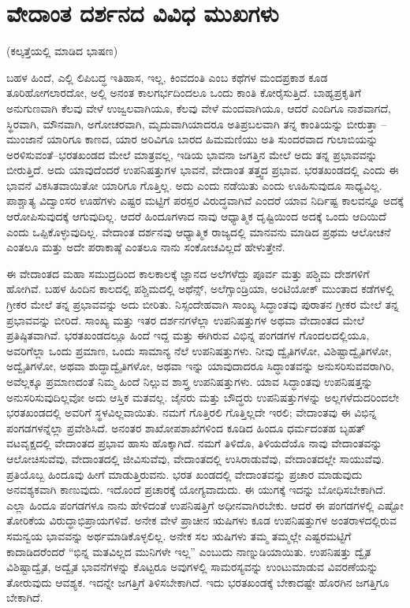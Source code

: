 
\chapter{ವೇದಾಂತ ದರ್ಶನದ ವಿವಿಧ ಮುಖಗಳು}

\begin{center}
(ಕಲ್ಕತ್ತೆಯಲ್ಲಿ ಮಾಡಿದ ಭಾಷಣ)
\end{center}

ಬಹಳ ಹಿಂದೆ, ಎಲ್ಲಿ ಲಿಪಿಬದ್ಧ ಇತಿಹಾಸ, ಇಲ್ಲ, ಕಿಂವದಂತಿ ಎಂಬ ಕಥೆಗಳ ಮಂದಪ್ರಕಾಶ ಕೂಡ ತೂರಿಹೋಗಲಾರದೋ, ಅಲ್ಲಿ ಅನಂತ ಕಾಲಗರ್ಭದಿಂದಲೂ ಒಂದು ಕಾಂತಿ ಕೋರೈಸುತ್ತಿದೆ. ಬಾಹ್ಯಪ್ರಕೃತಿಗೆ ಅನುಗುಣವಾಗಿ ಕೆಲವು ವೇಳೆ ಉಜ್ವಲವಾಗಿಯೂ, ಕೆಲವು ವೇಳೆ ಮಂದವಾಗಿಯೂ, ಆದರೆ ಎಂದಿಗೂ ನಾಶವಾಗದೆ, ಸ್ಥಿರವಾಗಿ, ಮೌನವಾಗಿ, ಅಗೋಚರವಾಗಿ, ಮೃದುವಾಗಿಯಾದರೂ ಅತಿಪ್ರಬಲವಾಗಿ ತನ್ನ ಕಾಂತಿಯನ್ನು ಬೀರುತ್ತಾ – ಮುಂಜಾನೆ ಯಾರಿಗೂ ಕಾಣದ, ಯಾರ ಅರಿವಿಗೂ ಬಾರದ ಹಿಮಮಣಿಯು ಅತಿ ಸುಂದರವಾದ ಗುಲಾಬಿಯನ್ನು ಅರಳಿಸುವಂತೆ–ಭರತಖಂಡದ ಮೇಲೆ ಮಾತ್ರವಲ್ಲ, ಇಡಿಯ ಭಾವನಾ ಜಗತ್ತಿನ ಮೇಲೆ ಅದು ತನ್ನ ಪ್ರಭಾವವನ್ನು ಬೀರುತ್ತಿದೆ. ಅದು ಯಾವುದೆಂದರೆ ಉಪನಿಷತ್ತುಗಳ ಭಾವನೆ, ವೇದಾಂತ ತತ್ತ್ವದ ಪ್ರಭಾವ. ಭರತಖಂಡದಲ್ಲಿ ಎಂದು ಈ ಭಾವನೆ ವಿಕಸಿತವಾಯಿತೋ ಯಾರಿಗೂ ಗೊತ್ತಿಲ್ಲ. ಅದು ಎಂದು ನಡೆಯಿತು ಎಂದು ಊಹಿಸುವುದೂ ಸಾಧ್ಯವಿಲ್ಲ. ಪಾಶ್ಚಾತ್ಯ ವಿದ್ವಾಂಸರ ಊಹೆಗಳು ಎಷ್ಟರ ಮಟ್ಟಿಗೆ ಪರಸ್ಪರ ವಿರುದ್ಧವಾಗಿವೆ ಎಂದರೆ ಯಾವ ನಿರ್ದಿಷ್ಟ ಕಾಲವನ್ನೂ ಅದಕ್ಕೆ ಆರೋಪಿಸುವುದಕ್ಕೆ ಆಗುವುದಿಲ್ಲ. ಆದರೆ ಹಿಂದೂಗಳಾದ ನಾವು ಆಧ್ಯಾತ್ಮಿಕ ದೃಷ್ಟಿಯಿಂದ ಅದಕ್ಕೆ ಒಂದು ಆದಿಯಿದೆ ಎಂದು ಒಪ್ಪಿಕೊಳ್ಳುವುದಿಲ್ಲ. ವೇದಾಂತ ದರ್ಶನವು ಆಧ್ಯಾತ್ಮಿಕ ರಾಜ್ಯದಲ್ಲಿ ಮಾನವನು ಮಾಡಿದ ಪ್ರಥಮ ಆಲೋಚನೆ ಎಂತಲೂ ಮತ್ತು ಅದೇ ಪರಾಕಾಷ್ಠೆ ಎಂತಲೂ ನಾನು ಸಂಕೋಚವಿಲ್ಲದೆ ಹೇಳುತ್ತೇನೆ.

ಈ ವೇದಾಂತದ ಮಹಾ ಸಮುದ್ರದಿಂದ ಕಾಲಕಾಲಕ್ಕೆ ಜ್ಞಾನದ ಅಲೆಗಳೆದ್ದು ಪೂರ್ವ ಮತ್ತು ಪಶ್ಚಿಮ ದೇಶಗಳಿಗೆ ಹೋಗಿವೆ. ಬಹಳ ಹಿಂದಿನ ಕಾಲದಲ್ಲಿ ಪಶ್ಚಿಮದಲ್ಲಿ ಅಥೆನ್ಸ್, ಅಲೆಗ್ಸಾಂಡ್ರಿಯಾ, ಅಂಟಿಯೋಕ್​ ಮುಂತಾದ ಕಡೆಗಳಲ್ಲಿ ಗ್ರೀಕರ ಮೇಲೆ ತನ್ನ ಪ್ರಭಾವವನ್ನು ಅದು ಬೀರಿತು. ನಿಸ್ಸಂದೇಹವಾಗಿ ಸಾಂಖ್ಯ ಸಿದ್ಧಾಂತವು ಪುರಾತನ ಗ್ರೀಕರ ಮೇಲೆ ತನ್ನ ಪ್ರಭಾವವನ್ನು ಬೀರಿದೆ. ಸಾಂಖ್ಯ ಮತ್ತು ಇತರ ದರ್ಶನಗಳೆಲ್ಲಾ ಉಪನಿಷತ್ತುಗಳ ಅಥವಾ ವೇದಾಂತದ ಮೇಲೆ ಪ್ರತಿಷ್ಠಿತವಾಗಿವೆ. ಭರತಖಂಡದಲ್ಲೂ ಹಿಂದೆ ಇದ್ದ ಮತ್ತು ಈಗಿರುವ ವಿಭಿನ್ನ ಪಂಗಡಗಳ ಗೊಂದಲದಲ್ಲಿಯೂ, ಅವರಿಗೆಲ್ಲಾ ಒಂದು ಪ್ರಮಾಣ, ಒಂದು ಸಾಮಾನ್ಯ ನೆಲೆ ಉಪನಿಷತ್ತುಗಳು. ನೀವು ದ್ವೈತಿಗಳೋ, ವಿಶಿಷ್ಟಾದ್ವೈತಿಗಳೋ, ಅದ್ವೈತಿಗಳೋ, ಅಥವಾ ಶುದ್ಧಾದ್ವೈತಿಗಳೋ, ಅಥವಾ ಇನ್ನು ಯಾವುದಾದರೂ ಸಿದ್ಧಾಂತವನ್ನು ಅನುಸರಿಸುವವರಾಗಿರಿ, ಅವೆಲ್ಲಕ್ಕೂ ಪ್ರಮಾಣದಂತೆ ನಿಮ್ಮ ಹಿಂದೆ ನಿಲ್ಲುವ ಶಾಸ್ತ್ರ ಉಪನಿಷತ್ತುಗಳು. ಯಾವ ಸಿದ್ಧಾಂತವು ಉಪನಿಷತ್ತನ್ನು ಅನುಸರಿಸುವುದಿಲ್ಲವೋ ಅದು ಆಸ್ತಿಕ ಮತವಲ್ಲ. ಜೈನರು ಮತ್ತು ಬೌದ್ಧರು ಉಪನಿಷತ್ತುಗಳನ್ನು ಅಲ್ಲಗಳೆದುದರಿಂದಲೇ ಭರತಖಂಡದಲ್ಲಿ ಅವರಿಗೆ ಸ್ಥಳವಿಲ್ಲವಾಯಿತು. ನಮಗೆ ಗೊತ್ತಿರಲಿ ಗೊತ್ತಿಲ್ಲದೇ ಇರಲಿ; ವೇದಾಂತವು ಈ ವಿಭಿನ್ನ ಪಂಗಡಗಳನ್ನೆಲ್ಲಾ ಪ್ರವೇಶಿಸಿದೆ. ಅನಂತರ ಶಾಖೋಪಶಾಖೆಗಳಿಂದ ಕೂಡಿದ ಹಿಂದೂ ಧರ್ಮದಂತಹ ಬೃಹತ್​ ವಟವೃಕ್ಷದಲ್ಲಿ ವೇದಾಂತದ ಪ್ರಭಾವ ಹಾಸು ಹೊಕ್ಕಾಗಿದೆ. ನಮಗೆ ತಿಳಿದೊ, ತಿಳಿಯದೆಯೊ ನಾವು ವೇದಾಂತವನ್ನು ಆಲೋಚಿಸುವೆವು, ವೇದಾಂತದಲ್ಲಿ ಜೀವಿಸುವೆವು, ವೇದಾಂತದಲ್ಲಿ ಉಸಿರಾಡುವೆವು, ವೇದಾಂತದಲ್ಲೇ ಸಾಯುವೆವು. ಪ್ರತಿಯೊಬ್ಬ ಹಿಂದೂವು ಹೀಗೆ ಮಾಡುತ್ತಿರುವನು. ಭರತ ಖಂಡದಲ್ಲಿ ವೇದಾಂತವನ್ನು ಪ್ರಚಾರ ಮಾಡುವುದು ಅನವಶ್ಯಕವಾಗಿ ಕಾಣುವುದು. ಇದೊಂದೆ ಪ್ರಚಾರಕ್ಕೆ ಯೋಗ್ಯವಾದುದು. ಈ ಯುಗಕ್ಕೆ ಇದನ್ನು ಬೋಧಿಸಬೇಕಾಗಿದೆ. ಎಲ್ಲಾ ಹಿಂದೂ ಪಂಗಡಗಳೂ ನಾನು ಹೇಳಿದಂತೆ ಉಪನಿಷತ್ತಿಗೆ ಅಧೀನವಾಗಿರಬೇಕು. ಆದರೆ ಈ ಪಂಗಡಗಳಲ್ಲಿ ಎಷ್ಟೋ ತೋರಿಕೆಯ ವಿರುದ್ಧಾಭಿಪ್ರಾಯಗಳಿವೆ. ಅನೇಕ ವೇಳೆ ಪ್ರಾಚೀನ ಋಷಿಗಳು ಕೂಡ ಉಪನಿಷತ್ತುಗಳ ಅಂತರಾಳದಲ್ಲಿರುವ ಸಮನ್ವಯ ಭಾವವನ್ನು ಅರ್ಥಮಾಡಿಕೊಳ್ಳಲಿಲ್ಲ. ಅನೇಕ ಸಲ ಋಷಿಗಳು ತಮ್ಮ ತಮ್ಮಲ್ಲೇ ಎಷ್ಟರಮಟ್ಟಿಗೆ ಕಾದಾಡಿದರೆಂದರೆ “ಭಿನ್ನ ಮತವಿಲ್ಲದ ಮುನಿಗಳೇ ಇಲ್ಲ” ಎಂಬುದು ನಾಣ್ನುಡಿಯಾಯಿತು. ಉಪನಿಷತ್ತು ದ್ವೈತ ವಿಶಿಷ್ಟಾದ್ವೈತ, ಅದ್ವೈತ ಭಾವನೆಗಳನ್ನು ಕೊಟ್ಟರೂ ಅವುಗಳಲ್ಲಿ ಸಾಮರಸ್ಯವನ್ನು ಉಂಟುಮಾಡುವ ವಿವರಣೆಯನ್ನು ತೋರುವುದು ಆವಶ್ಯಕ. ಇದನ್ನೇ ಜಗತ್ತಿಗೆ ತಿಳಿಸಬೇಕಾಗಿದೆ. ಇದು ಭರತಖಂಡಕ್ಕೆ ಬೇಕಾದಷ್ಟೇ ಹೊರಗಿನ ಜಗತ್ತಿಗೂ ಬೇಕಾಗಿದೆ.

